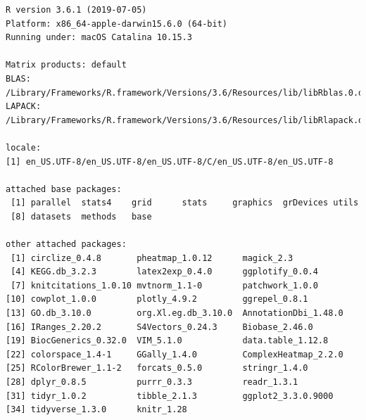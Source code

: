 \documentclass[11pt,]{article}
\begin{document}
\begin{verbatim}
R version 3.6.1 (2019-07-05)
Platform: x86_64-apple-darwin15.6.0 (64-bit)
Running under: macOS Catalina 10.15.3

Matrix products: default
BLAS:   /Library/Frameworks/R.framework/Versions/3.6/Resources/lib/libRblas.0.dylib
LAPACK: /Library/Frameworks/R.framework/Versions/3.6/Resources/lib/libRlapack.dylib

locale:
[1] en_US.UTF-8/en_US.UTF-8/en_US.UTF-8/C/en_US.UTF-8/en_US.UTF-8

attached base packages:
 [1] parallel  stats4    grid      stats     graphics  grDevices utils    
 [8] datasets  methods   base     

other attached packages:
 [1] circlize_0.4.8       pheatmap_1.0.12      magick_2.3          
 [4] KEGG.db_3.2.3        latex2exp_0.4.0      ggplotify_0.0.4     
 [7] knitcitations_1.0.10 mvtnorm_1.1-0        patchwork_1.0.0     
[10] cowplot_1.0.0        plotly_4.9.2         ggrepel_0.8.1       
[13] GO.db_3.10.0         org.Xl.eg.db_3.10.0  AnnotationDbi_1.48.0
[16] IRanges_2.20.2       S4Vectors_0.24.3     Biobase_2.46.0      
[19] BiocGenerics_0.32.0  VIM_5.1.0            data.table_1.12.8   
[22] colorspace_1.4-1     GGally_1.4.0         ComplexHeatmap_2.2.0
[25] RColorBrewer_1.1-2   forcats_0.5.0        stringr_1.4.0       
[28] dplyr_0.8.5          purrr_0.3.3          readr_1.3.1         
[31] tidyr_1.0.2          tibble_2.1.3         ggplot2_3.3.0.9000  
[34] tidyverse_1.3.0      knitr_1.28          


\end{verbatim}
\end{document}
